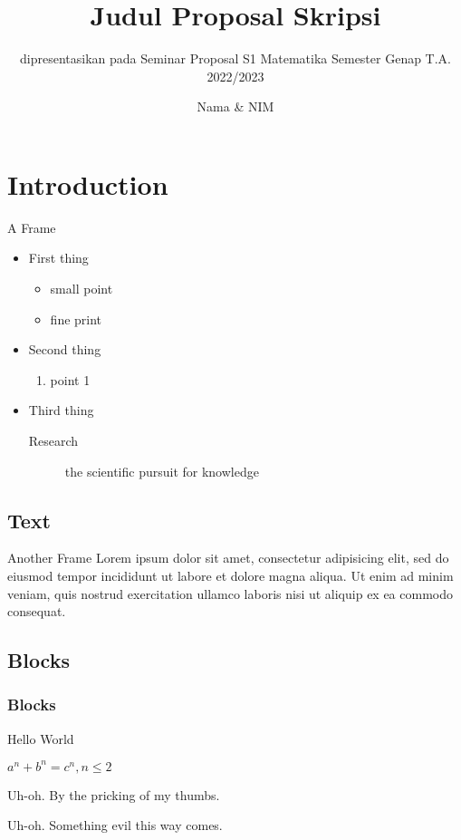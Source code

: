\documentclass{beamer}
\title{Judul Proposal Skripsi}
\subtitle{dipresentasikan pada Seminar Proposal S1 Matematika Semester Genap T.A. 2022/2023}
\author{Nama \& NIM}
\date{}
\institute{S1 Matematika}
\begin{document}
\begin{frame}[plain,t]
\titlepage
\end{frame}


\section{Introduction}
\begin{frame}{A Frame}
\begin{itemize}
\item First thing
	\begin{itemize}
	\item small point
	\item fine print
	\end{itemize}
\item Second thing
	\begin{enumerate}
	\item point 1
	\end{enumerate}
\item Third thing
	\begin{description}
	\item[Research] the scientific pursuit for knowledge
	\end{description}
\end{itemize}
\end{frame}

\subsection{Text}
\begin{frame}{Another Frame}
Lorem ipsum dolor sit amet, consectetur adipisicing elit, sed do eiusmod tempor incididunt ut labore et dolore magna aliqua. Ut enim ad minim veniam, quis nostrud exercitation ullamco laboris nisi ut aliquip ex ea commodo consequat.
\end{frame}

\subsection{Blocks}
\begin{frame}
\frametitle{Blocks}
\begin{definition}[Greetings]
Hello World
\end{definition}

\begin{theorem}
$a^n + b^n = c^n, n \leq 2$
\end{theorem}

\begin{alertblock}{Uh-oh.}
By the pricking of my thumbs.
\end{alertblock}

\begin{exampleblock}{Uh-oh.}
Something evil this way comes.
\end{exampleblock}

\end{frame}

\end{document}

